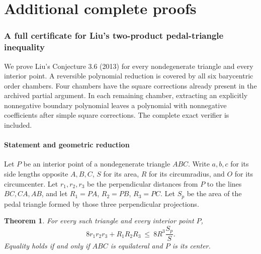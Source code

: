 \documentclass[11pt,a4paper]{article}
\numberwithin{equation}{section}
\newtheorem{theorem}{Theorem}[section]
\theoremstyle{definition}
\theoremstyle{remark}
\newenvironment{sectionabstract}{\par\smallskip\begingroup\small\noindent}{\par\endgroup\medskip}
\begin{document}
\par\endgroup


\clearpage
\part{Additional complete proofs}

\begingroup

\section{\texorpdfstring{A full certificate for Liu's two-product pedal-triangle inequality}{A full certificate for Liu's two-product pedal-triangle inequality}}\label{section:add34keio}
\par\medskip


\begin{sectionabstract}
We prove Liu's Conjecture 3.6 (2013) for every nondegenerate triangle
and every interior point. A reversible polynomial reduction is covered
by all six barycentric order chambers. Four chambers have the square
corrections already present in the archived partial argument. In each
remaining chamber, extracting an explicitly nonnegative boundary
polynomial leaves a polynomial with nonnegative coefficients after
simple square corrections. The complete exact verifier is included.
\end{sectionabstract}

\subsection{Statement and geometric reduction}

Let $P$ be an interior point of a nondegenerate triangle $ABC$.
Write $a,b,c$ for its side lengths opposite $A,B,C$, $S$ for its area,
$R$ for its circumradius, and $O$ for its circumcenter.
Let $r_1,r_2,r_3$ be the perpendicular distances from $P$ to the
lines $BC,CA,AB$, and let $R_1=PA$, $R_2=PB$, $R_3=PC$.
Let $S_p$ be the area of the pedal triangle formed by those three
perpendicular projections.

\begin{theorem}\label{add34keio:main}
For every such triangle and every interior point $P$,
\begin{equation}\label{add34keio:goal}
 8r_1r_2r_3+R_1R_2R_3\ \le\ 8R^3\frac{S_p}{S}.
\end{equation}
Equality holds if and only if $ABC$ is equilateral and $P$ is its center.
\end{theorem}
\end{document}
